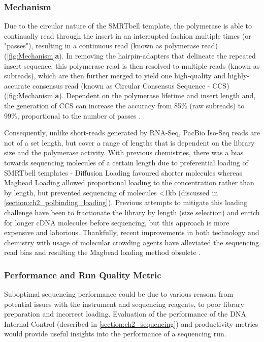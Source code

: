 \subsubsection{Mechanism}
Due to the circular nature of the SMRTbell template, the polymerase is able to continually read through the insert in an interrupted fashion multiple times (or "passes"), resulting in a continuous read (known as polymerase read) (\cref{fig:Mechanism}\textbf{a}). In removing the hairpin-adapters that delineate the repeated insert sequence, this polymerase read is then resolved to multiple reads (known as subreads), which are then further merged to yield one high-quality and highly-accurate consensus read (known as Circular Consensus Sequence - CCS) (\cref{fig:Mechanism}\textbf{a}). Dependent on the polymerase lifetime and insert length and, the generation of CCS can increase the accuracy from 85\% (raw subreads) to 99\%, proportional to the number of passes \cite{Travers2010}. 

Consequently, unlike short-reads generated by RNA-Seq, PacBio Iso-Seq reads are not of a set length, but cover a range of lengths that is dependent on the library size and the polymerase activity\cite{Ardui2018,Rhoads2015}. With previous chemistries, there was a bias towards sequencing molecules of a certain length due to preferential loading of SMRTbell templates - Diffusion Loading favoured shorter molecules\cite{Loomis2013} whereas Magbead Loading allowed proportional loading to the concentration rather than by length, but prevented sequencing of molecules <1kb (discussed in \cref{section:ch2_polbinding_loading}). Previous attempts to mitigate this loading challenge have been to fractionate the library by length (size selection) and enrich for longer cDNA molecules before sequencing\cite{Au2013}, but this approach is more expensive and laborious. Thankfully, recent improvements in both technology and chemistry with usage of molecular crowding agents have alleviated the sequencing read bias and resulting the Magbead loading method obsolete \cite{Oikonomopoulos2020}.   


\subsubsection{Performance and Run Quality Metric}
Suboptimal sequencing performance could be due to various reasons from potential issues with the instrument and sequencing reagents, to poor library preparation and incorrect loading. Evaluation of the performance of the DNA Internal Control (described in \cref{section:ch2_sequencing}) and productivity metrics would provide useful insights into the performance of a sequencing run. 

